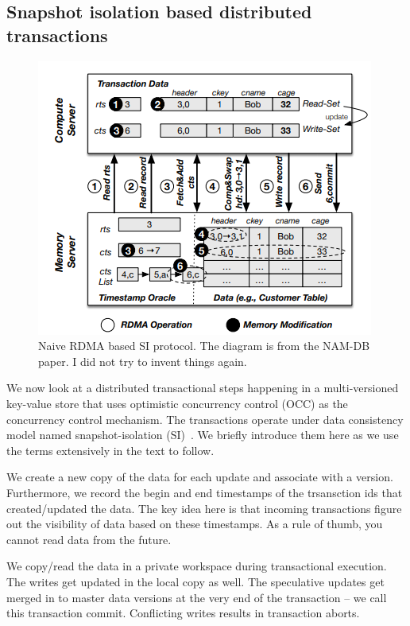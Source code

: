 \subsection{Snapshot isolation based distributed transactions}

\begin{figure}[]   
	\centering
	\includegraphics[width=\linewidth]{figures/SI.png} 
	\caption{\small Naive RDMA based SI protocol. The diagram is from the NAM-DB paper. I did not try to invent things again.} 
	\label{fig:si} 
\end{figure}

We now look at a distributed transactional steps happening in a 
multi-versioned key-value store that uses optimistic concurrency control (OCC)
as the concurrency control mechanism. The transactions operate under data consistency
model named snapshot-isolation (SI)~\cite{isolation}. We briefly introduce them here as we use the terms 
extensively in the text to follow.

We create a new copy of the data for each update and associate with a version. Furthermore, we record the 
begin and end timestamps of the trsansction ids that created/updated the data. The key idea here is that
incoming transactions figure out the visibility of data based on these timestamps. As a rule of thumb, you
cannot read data from the future.

We copy/read the data in a private workspace during transactional execution. The writes get updated in the 
local copy as well. The speculative updates get merged in to master data versions at the very
end of the transaction -- we call this transaction commit. Conflicting writes results in transaction aborts.

